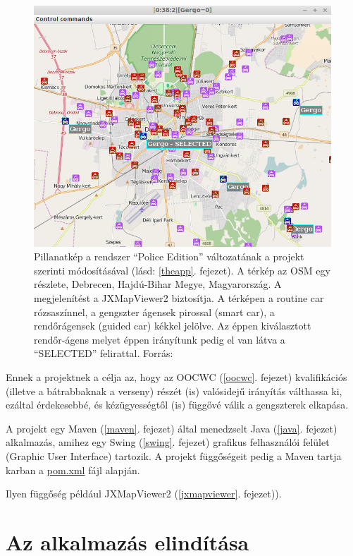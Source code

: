 \documentclass[a4paper,12pt]{report}
\begin{document}
\begin{figure}[ht]
\centerline{
\includegraphics[width=4.4in]{img/copselected}}
\caption{Pillanatkép a rendszer ``Police Edition'' változatának a projekt szerinti módosításával (lásd: \ref{theapp}. fejezet). A térkép az OSM egy részlete, Debrecen, Hajdú-Bihar Megye, Magyarország. A megjelenítést a JXMapViewer2 \cite{jxmapv} biztosítja. A térképen a routine car rózsaszínnel, a gengszter ágensek pirossal (smart car), a rendőrágensek (guided car) kékkel jelölve. Az éppen kiválasztott rendőr-ágens melyet éppen irányítunk pedig el van látva a ``SELECTED'' felirattal. Forrás: \cite{infocomjournal} 
\label{police}}
\end{figure}

Ennek a projektnek a célja az, hogy az OOCWC (\ref{oocwc}. fejezet) kvalifikációs (illetve a bátrabbaknak a verseny) részét (is) valósidejű irányítás válthassa ki, ezáltal érdekesebbé, és kézügyességtől (is) függővé válik a gengszterek elkapása.

\vspace{2mm}
A projekt egy Maven (\ref{maven}. fejezet) által menedzselt Java (\ref{java}. fejezet) alkalmazás, amihez egy Swing (\ref{swing}. fejezet) grafikus felhasználói felület (Graphic User Interface) tartozik. A projekt függőségeit pedig a Maven tartja karban a \url{pom.xml} fájl alapján. 

\vspace{2mm}
Ilyen függőség például JXMapViewer2 \cite{jxmapv} (\ref{jxmapviewer}. fejezet)).


\section{Az alkalmazás elindítása}
\label{howtorun}
\end{document}
